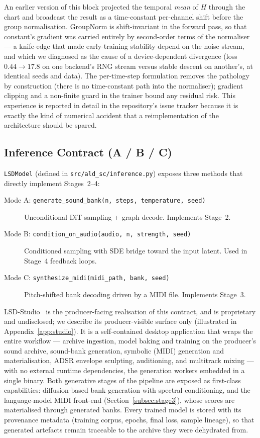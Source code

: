 \documentclass[12pt,a4paper]{article}
\begin{document}
An earlier version of this block projected the temporal \emph{mean} of
$H$ through the chart and broadcast the result as a time-constant
per-channel shift before the group normalisation. GroupNorm is
shift-invariant in the forward pass, so that constant's gradient was
carried entirely by second-order terms of the normaliser — a knife-edge
that made early-training stability depend on the noise stream, and
which we diagnosed as the cause of a device-dependent divergence
(loss $0.44 \to 17.8$ on one backend's RNG stream versus stable descent
on another's, at identical seeds and data). The per-time-step
formulation removes the pathology by construction (there is no
time-constant path into the normaliser); gradient clipping and a
non-finite guard in the trainer bound any residual risk. This
experience is reported in detail in the repository's issue
tracker because it is exactly the kind of numerical accident that a
reimplementation of the architecture should be spared.

\subsection{Inference Contract (A / B / C)}
\label{subsec:arch_inference}

\texttt{LSDModel} (defined in \texttt{src/ald\_sc/inference.py})
exposes three methods that directly implement Stages~2--4:

\begin{description}
  \item[Mode A: \texttt{generate\_sound\_bank(n, steps, temperature, seed)}]
    Unconditional DiT sampling + graph decode. Implements Stage~2.
  \item[Mode B: \texttt{condition\_on\_audio(audio, n, strength, seed)}]
    Conditioned sampling with SDE bridge toward the input latent.
    Used in Stage~4 feedback loops.
  \item[Mode C: \texttt{synthesize\_midi(midi\_path, bank, seed)}]
    Pitch-shifted bank decoding driven by a MIDI file.
    Implements Stage~3.
\end{description}

LSD-Studio~\cite{lsdstudio} is the producer-facing realisation of this
contract, and is proprietary and undisclosed; we describe its
producer-visible surface only (illustrated in
Appendix~\ref{app:studio}). It is a self-contained desktop
application that wraps the entire workflow — archive ingestion, model
baking and training on the producer's sound archive, sound-bank
generation, symbolic (MIDI) generation and materialisation, ADSR
envelope sculpting, auditioning, and multitrack mixing — with no
external runtime dependencies, the generation workers embedded in a
single binary. Both generative stages of the pipeline are exposed as
first-class capabilities: diffusion-based bank generation with spectral
conditioning, and the language-model MIDI front-end
(Section~\ref{subsec:stage3}), whose scores are materialised through
generated banks. Every trained model is stored with its provenance
metadata (training corpus, epochs, final loss, sample lineage), so that
generated artefacts remain traceable to the archive they were
dehydrated from.
\end{document}
